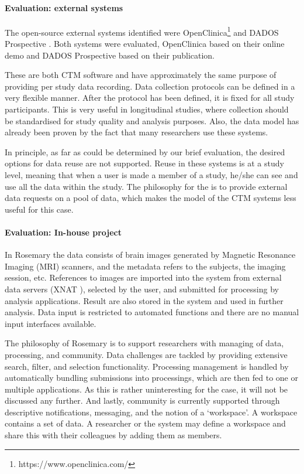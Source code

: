 \paragraph{Evaluation: external systems}
The open-source external systems identified were OpenClinica\footnote{https://www.openclinica.com/} and DADOS Prospective \cite{dados}.
Both systems were evaluated, OpenClinica based on their online demo and DADOS Prospective based on their publication.

These are both CTM software and have approximately the same purpose of providing per study data recording.
Data collection protocols can be defined in a very flexible manner.
After the protocol has been defined, it is fixed for all study participants.
This is very useful in longitudinal studies, where collection should be standardised for study quality and analysis purposes.
Also, the data model has already been proven by the fact that many researchers use these systems.

In principle, as far as could be determined by our brief evaluation, the desired options for data reuse are not supported.
Reuse in these systems is at a study level, meaning that when a user is made a member of a study, he/she can see and use all the data within the study.
The philosophy for the \ivfsystem{} is to provide external data requests on a pool of data, which makes the model of the CTM systems less useful for this case.

\paragraph{Evaluation: In-house project}
In Rosemary the data consists of brain images generated by Magnetic Resonance Imaging (MRI) scanners, and the metadata refers to the subjects, the imaging session, etc. 
References to images are imported into the system from external data servers (XNAT \cite{xnat}), selected by the user, and submitted for processing by analysis applications. 
Result are also stored in the system and used in further analysis.
Data input is restricted to automated functions and there are no manual input interfaces available.

The philosophy of Rosemary is to support researchers with managing of data, processing, and community.
Data challenges are tackled by providing extensive search, filter, and selection functionality.
Processing management is handled by automatically bundling submissions into processings, which are then fed to one or multiple applications. As this is rather uninteresting for the \ivfsystem{} case, it will not be discussed any further.
And lastly, community is currently supported through descriptive notifications, messaging, and the notion of a `workspace'.
A workspace contains a set of data. A researcher or the system may define a workspace and share this with their colleagues by adding them as members.

